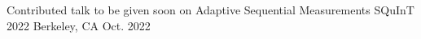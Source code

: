 

\begin{cventries}

  \cventry
    {Contributed talk to be given soon on Adaptive Sequential Measurements} %
    {SQuInT 2022} %
    {Berkeley, CA} %
    {Oct. 2022} %
    {}

\end{cventries}
